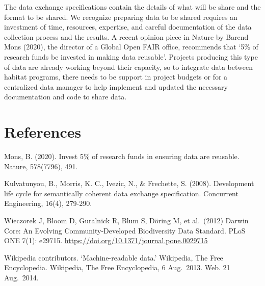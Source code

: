 \documentclass[
]{article}
\begin{document}
The data exchange specifications contain the details of what will be
share and the format to be shared. We recognize preparing data to be
shared requires an investment of time, resources, expertise, and careful
documentation of the data collection process and the results. A recent
opinion piece in Nature by Barend Mons (2020), the director of a Global
Open FAIR office, recommends that `5\% of research funds be invested in
making data reusable'. Projects producing this type of data are already
working beyond their capacity, so to integrate data between habitat
programs, there needs to be support in project budgets or for a
centralized data manager to help implement and updated the necessary
documentation and code to share data.

\hypertarget{references}{%
\section{References}\label{references}}

Mons, B. (2020). Invest 5\% of research funds in ensuring data are
reusable. Nature, 578(7796), 491.

Kulvatunyou, B., Morris, K. C., Ivezic, N., \& Frechette, S. (2008).
Development life cycle for semantically coherent data exchange
specification. Concurrent Engineering, 16(4), 279-290.

Wieczorek J, Bloom D, Guralnick R, Blum S, Döring M, et al.~(2012)
Darwin Core: An Evolving Community-Developed Biodiversity Data Standard.
PLoS ONE 7(1): e29715.
\url{https://doi.org/10.1371/journal.pone.0029715}

Wikipedia contributors. `Machine-readable data.' Wikipedia, The Free
Encyclopedia. Wikipedia, The Free Encyclopedia, 6 Aug.~2013. Web. 21
Aug.~2014.
\end{document}
